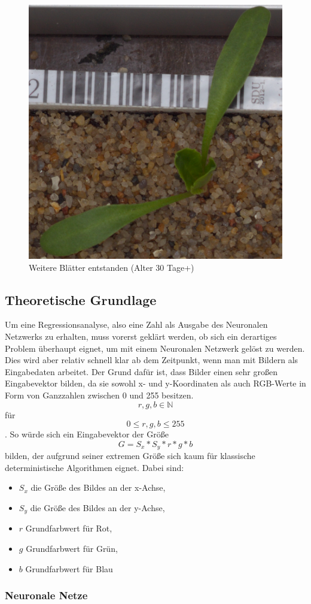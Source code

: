 \begin{figure}
    \centering
    \includegraphics[width=0.6\linewidth]{444.png}
    \caption{Weitere Blätter entstanden (Alter 30 Tage+)}
    \label{fig:enter-label}
\end{figure}
\subsection{Theoretische Grundlage}
Um eine Regressionsanalyse, also eine Zahl als Ausgabe des Neuronalen Netzwerks zu erhalten, muss vorerst geklärt werden, ob sich ein derartiges Problem überhaupt eignet, um mit einem Neuronalen Netzwerk gelöst zu werden. Dies wird aber relativ schnell klar ab dem Zeitpunkt, wenn man mit Bildern als Eingabedaten arbeitet. Der Grund dafür ist, dass Bilder einen sehr großen Eingabevektor bilden, da sie sowohl x- und y-Koordinaten als auch RGB-Werte in Form von Ganzzahlen zwischen 0 und 255 besitzen. 
\[r, g, b \in \mathbb{N}\] für \[0 \leq r, g, b \leq 255\].
So würde sich ein Eingabevektor der Größe
\[G = S_x * S_y * r * g * b\] bilden, der aufgrund seiner extremen Größe sich kaum für klassische deterministische Algorithmen eignet. 
Dabei sind:
\begin{itemize}
    \item $S_x$ die Größe des Bildes an der x-Achse,
    \item $S_y$ die Größe des Bildes an der y-Achse,
    \item $r$ Grundfarbwert für Rot,
    \item $g$ Grundfarbwert für Grün,
    \item $b$ Grundfarbwert für Blau
\end{itemize}
\subsubsection{Neuronale Netze}

